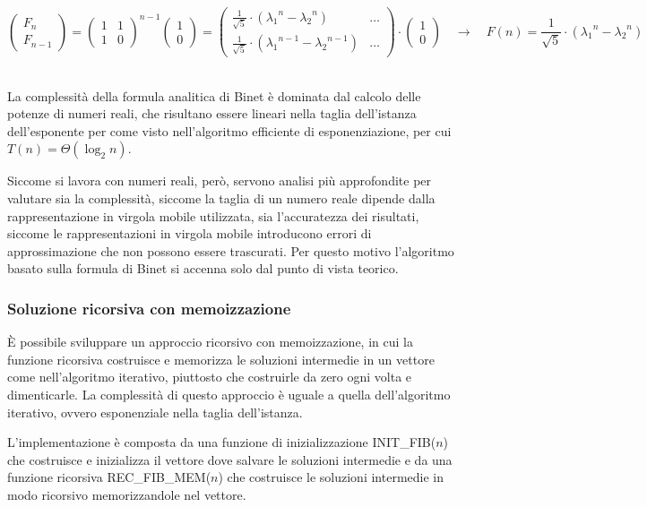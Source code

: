 \[\begin{pmatrix} F_n \\ F_{n-1} \end{pmatrix} = \begin{pmatrix} 1 & 1 \\ 1 & 0 \end{pmatrix}^{n-1} \begin{pmatrix} 1 \\ 0 \end{pmatrix} = \begin{pmatrix} \frac{1}{\sqrt{5}} \cdot \left( {\lambda_1}^n - {\lambda_2}^n \right) & \dots \\[8pt] \frac{1}{\sqrt{5}} \cdot \left( {\lambda_1}^{n-1} - {\lambda_2}^{n-1} \right) & \dots \end{pmatrix} \cdot \begin{pmatrix} 1 \\ 0 \end{pmatrix} \quad \rightarrow \quad F(n) = \frac{1}{\sqrt{5}} \cdot \left( {\lambda_1}^n - {\lambda_2}^n \right)\]
~

\noindent
La complessità della formula analitica di Binet è dominata dal calcolo delle potenze di numeri reali, che risultano
essere lineari nella taglia dell'istanza dell'esponente per come visto nell'algoritmo efficiente di esponenziazione,
per cui \(T(n) = \Theta(\log_2 n)\).

Siccome si lavora con numeri reali, però, servono analisi più approfondite per valutare sia la complessità, siccome
la taglia di un numero reale dipende dalla rappresentazione in virgola mobile utilizzata, sia l'accuratezza dei risultati,
siccome le rappresentazioni in virgola mobile introducono errori di approssimazione che non possono essere trascurati.
Per questo motivo l'algoritmo basato sulla formula di Binet si accenna solo dal punto di vista teorico.

\subsubsection*{Soluzione ricorsiva con memoizzazione}
È possibile sviluppare un approccio ricorsivo con memoizzazione, in cui la funzione ricorsiva costruisce e memorizza le
soluzioni intermedie in un vettore come nell'algoritmo iterativo, piuttosto che costruirle da zero ogni volta e dimenticarle.
La complessità di questo approccio è uguale a quella dell'algoritmo iterativo, ovvero esponenziale nella taglia dell'istanza.

L'implementazione è composta da una funzione di inizializzazione INIT\_FIB(\(n\)) che costruisce e inizializza il vettore
dove salvare le soluzioni intermedie e da una funzione ricorsiva REC\_FIB\_MEM(\(n\)) che costruisce le soluzioni intermedie
in modo ricorsivo memorizzandole nel vettore.


